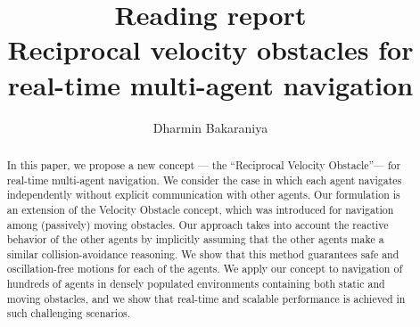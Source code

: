 \documentclass[12pt]{article}
\title{Reading report\\Reciprocal velocity obstacles for real-time multi-agent navigation\cite{van2008reciprocal}}
\author{Dharmin Bakaraniya}
\begin{document}
\maketitle{}

\begin{abstract}
In this paper, we propose a new concept —
the “Reciprocal Velocity Obstacle”— for real-time multi-agent
navigation. We consider the case in which each agent navigates independently without explicit communication with other
agents. Our formulation is an extension of the Velocity Obstacle
concept\cite{fiorini1998motion}, which was introduced for navigation among (passively) moving obstacles. Our approach takes into account the
reactive behavior of the other agents by implicitly assuming that
the other agents make a similar collision-avoidance reasoning.
We show that this method guarantees safe and oscillation-free motions for each of the agents. We apply our concept
to navigation of hundreds of agents in densely populated
environments containing both static and moving obstacles, and
we show that real-time and scalable performance is achieved
in such challenging scenarios.
\end{abstract}
\end{document}
